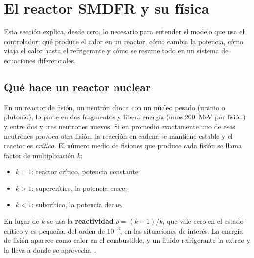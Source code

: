 \section{El reactor SMDFR y su física}\label{sec:reactor}
Esta sección explica, desde cero, lo necesario para entender el modelo que usa el
controlador: qué produce el calor en un reactor, cómo cambia la potencia, cómo viaja el calor
hasta el refrigerante y cómo se resume todo en un sistema de ecuaciones diferenciales.

\subsection{Qué hace un reactor nuclear}
En un reactor de fisión, un neutrón choca con un núcleo pesado (uranio o plutonio), lo parte
en dos fragmentos y libera energía (unos 200~MeV por fisión) y entre dos y tres neutrones
nuevos. Si en promedio exactamente uno de esos neutrones provoca otra fisión, la reacción en
cadena se mantiene estable y el reactor es \emph{crítico}. El número medio de fisiones que
produce cada fisión se llama factor de multiplicación $k$:
\begin{itemize}
  \item $k=1$: reactor crítico, potencia constante;
  \item $k>1$: supercrítico, la potencia crece;
  \item $k<1$: subcrítico, la potencia decae.
\end{itemize}
En lugar de $k$ se usa la \textbf{reactividad} $\rho=(k-1)/k$, que vale cero en el estado
crítico y es pequeña, del orden de $10^{-3}$, en las situaciones de interés. La energía de
fisión aparece como calor en el combustible, y un fluido refrigerante la extrae y la lleva a
donde se aprovecha~\cite{duderstadt1976}.

